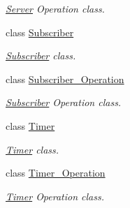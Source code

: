 \begin{DoxyCompactItemize}
\begin{DoxyCompactList}\small\item\em \hyperlink{classzcm_1_1Server}{Server} Operation class. \end{DoxyCompactList}\item 
class \hyperlink{classzcm_1_1Subscriber}{Subscriber}
\begin{DoxyCompactList}\small\item\em \hyperlink{classzcm_1_1Subscriber}{Subscriber} class. \end{DoxyCompactList}\item 
class \hyperlink{classzcm_1_1Subscriber__Operation}{Subscriber\+\_\+\+Operation}
\begin{DoxyCompactList}\small\item\em \hyperlink{classzcm_1_1Subscriber}{Subscriber} Operation class. \end{DoxyCompactList}\item 
class \hyperlink{classzcm_1_1Timer}{Timer}
\begin{DoxyCompactList}\small\item\em \hyperlink{classzcm_1_1Timer}{Timer} class. \end{DoxyCompactList}\item 
class \hyperlink{classzcm_1_1Timer__Operation}{Timer\+\_\+\+Operation}
\begin{DoxyCompactList}\small\item\em \hyperlink{classzcm_1_1Timer}{Timer} Operation class. \end{DoxyCompactList}\end{DoxyCompactItemize}
